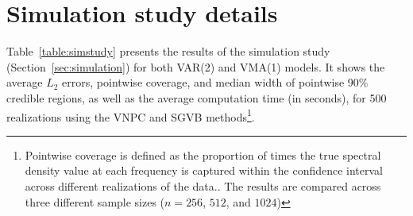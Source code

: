 \documentclass[%
 reprint,
 amsmath,amssymb,
 aps,
 nofootinbib,
]{revtex4-2}
\begin{document}
\section{Simulation study details}




\label{appdx:simstudy}





Table~\ref{table:simstudy} presents the results of the simulation study (Section~\ref{sec:simulation}) for both VAR(2) and VMA(1) models. It shows the average $L_2$ errors, pointwise coverage, and median width of pointwise 90\% credible regions, as well as the average computation time (in seconds), for 500 realizations using the VNPC and \ac{SGVB} methods\footnote{Pointwise coverage is defined as the proportion of times the true spectral density value at each frequency is captured within the confidence interval across different realizations of the data.. 
The results are compared across three different sample sizes ($n=256$, $512$, and $1024$)}.
\end{document}
